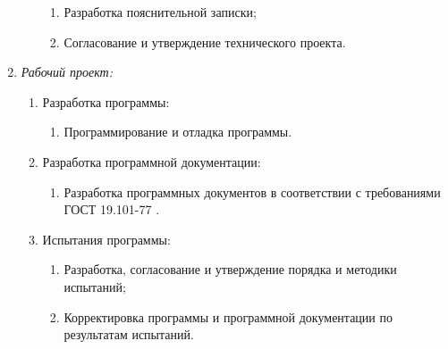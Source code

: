 \documentclass[a4paper,12pt,reqno]{article}
\begin{document}
\begin{enumerate}
\begin{enumerate}
			\begin{enumerate}
				\item Разработка пояснительной записки; 
				\item Согласование и утверждение технического проекта. 
			\end{enumerate}
		\end{enumerate}
		\item \textit{Рабочий проект:}
		\begin{enumerate}
			\item Разработка программы:
			\begin{enumerate}
				\item Программирование и отладка программы. 
			\end{enumerate}
			\item Разработка программной документации:
			\begin{enumerate}
				\item Разработка программных документов в соответствии с требованиями ГОСТ 19.101-77 \cite{gost}. 
			\end{enumerate}
			\item Испытания программы:
			\begin{enumerate}
				\item Разработка, согласование и утверждение порядка и методики испытаний; 
				\item Корректировка программы и программной документации по результатам испытаний.
			\end{enumerate}
		\end{enumerate}
	\end{enumerate}
	

						\newpage
	 \label{terms}
	
\end{document}
